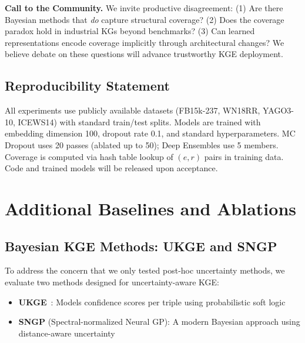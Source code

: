 \documentclass{article}
\begin{document}
\textbf{Call to the Community.} We invite productive disagreement: (1) Are there Bayesian methods that \emph{do} capture structural coverage? (2) Does the coverage paradox hold in industrial KGs beyond benchmarks? (3) Can learned representations encode coverage implicitly through architectural changes? We believe debate on these questions will advance trustworthy KGE deployment.

\subsection*{Reproducibility Statement}

All experiments use publicly available datasets (FB15k-237, WN18RR, YAGO3-10, ICEWS14) with standard train/test splits. Models are trained with embedding dimension 100, dropout rate 0.1, and standard hyperparameters. MC Dropout uses 20 passes (ablated up to 50); Deep Ensembles use 5 members. Coverage is computed via hash table lookup of $(e, r)$ pairs in training data. Code and trained models will be released upon acceptance.





\appendix

\section{Additional Baselines and Ablations}
\label{app:ablations}

\subsection{Bayesian KGE Methods: UKGE and SNGP}

To address the concern that we only tested post-hoc uncertainty methods, we evaluate two methods designed for uncertainty-aware KGE:

\begin{itemize}
    \item \textbf{UKGE}~\citep{chen2019ukge}: Models confidence scores per triple using probabilistic soft logic
    \item \textbf{SNGP} (Spectral-normalized Neural GP): A modern Bayesian approach using distance-aware uncertainty
\end{itemize}
\end{document}
